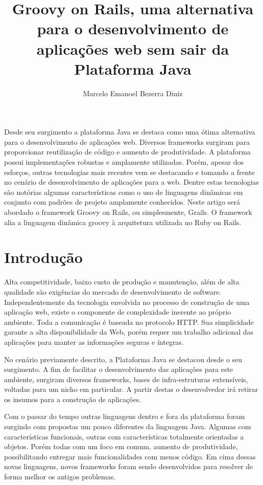 \documentclass[12pt]{article}
\title{Groovy on Rails, uma alternativa para o desenvolvimento de aplicações web
       sem sair da Plataforma Java}
\author{Marcelo Emanoel Bezerra Diniz\inst{1}}
\begin{document}
 

\maketitle

\begin{resumo} 
    
    Desde seu surgimento a plataforma Java se destaca como uma ótima alternativa
    para o desenvolvimento de aplicações web. Diversos frameworks surgiram para 
    proporcionar reutilização de código e aumento de produtividade. A plataforma
    possui implementações robustas e amplamente utilizadas. Porém, apesar dos 
    esforços, outras tecnologias mais recentes vem se destacando e tomando a 
    frente no cenário de desenvolvimento de aplicações para a web. Dentre estas 
    tecnologias são notórias algumas características como o uso de linguagens 
    dinâmicas em conjunto com padrões de projeto amplamente conhecidos. Neste 
    artigo será abordado o framework Groovy on Rails, ou simplesmente, Grails. 
    O framework alia a linguagem dinâmica groovy
    à arquitetura utilizada no Ruby on Rails. \nocite{*}
    
\end{resumo}

\section{Introdução}

    Alta competitividade, baixo custo de produção e manutenção, além de alta 
    qualidade são exigências do mercado de desenvolvimento de software. 
    Independentemente da tecnologia envolvida no processo de construção de uma 
    aplicação web, existe o componente de complexidade inerente ao próprio 
    ambiente. Toda a comunicação é baseada no protocolo HTTP. Sua simplicidade 
    garante a alta disponibilidade da Web, porém requer um trabalho adicional 
    das aplicações para manter as informações seguras e íntegras.

    No cenário previamente descrito, a Plataforma Java se destacou desde o seu 
    surgimento. A fim de facilitar o desenvolvimento das aplicações para este 
    ambiente, surgiram diversos frameworks, bases de infra-estruturas 
    extensíveis, voltadas para um nicho em particular. A partir destas o 
    desenvolvedor irá retirar os insumos para a construção de aplicações.

    Com o passar do tempo outras linguagens dentro e fora da plataforma foram 
    surgindo com propostas um pouco diferentes da linguagem Java. Algumas com 
    características funcionais, outras com características totalmente orientadas 
    a objetos. Porém todas com um foco em comum, aumento de produtividade, 
    possibilitando entregar mais funcionalidades com menos código. Em cima 
    dessas novas linguagens, novos frameworks foram sendo desenvolvidos para 
    resolver de forma melhor os antigos problemas.
    
\end{document}
